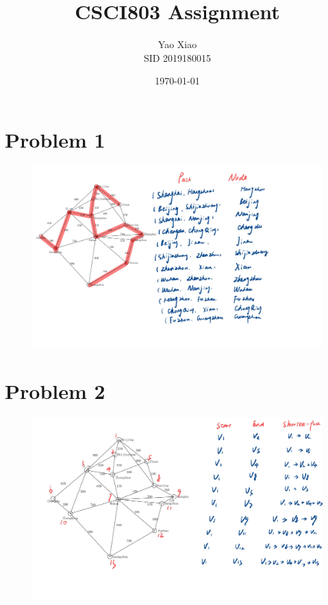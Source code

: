 \documentclass{article}
\title{CSCI803 Assignment}
\author{Yao Xiao \\ SID 2019180015}
\date{\today}
\begin{document}
\maketitle

\section{Problem 1}
\begin{figure}[H]
    \centering
    \includegraphics[width=1\textwidth]{Fig1}
\end{figure}


\section{Problem 2}
\begin{figure}[H]
    \centering
    \includegraphics[width=1\textwidth]{Fig2}
\end{figure}
\end{document}
